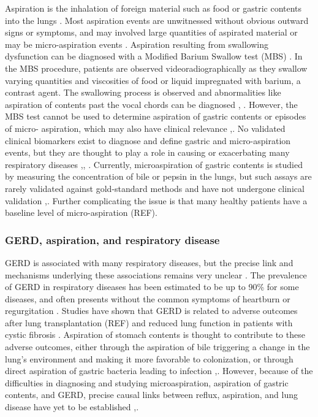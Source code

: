 \documentclass[12pt]{article}
\begin{document}
Aspiration is the inhalation of foreign material such as food or 
gastric contents into the lungs \cite{raghavendran-asp_injury-2011}. 
Most aspiration events are unwitnessed without obvious outward signs 
or symptoms, and may involved large quantities of aspirated material 
or may be micro-aspiration events \cite{raghavendran-asp_injury-2011}. 
Aspiration resulting from swallowing dysfunction can be diagnosed with 
a Modified Barium Swallow test (MBS) \cite{martinharris-mbs-2008}. In 
the MBS procedure, patients are observed videoradiographically as they 
swallow varying quantities and viscosities of food or liquid 
impregnated with barium, a contrast agent. The swallowing process is 
observed and abnormalities like aspiration of contents past the vocal 
chords can be diagnosed \cite{martinharris-clinical_mbs-2000},
\cite{martinharris-mbs-2008}. However, the MBS test cannot be used to 
determine aspiration of gastric contents or episodes of micro-
aspiration, which may also have clinical relevance 
\cite{raghavendran-asp_injury-2011},\cite{lee-pulm_asp-2014}. No validated clinical 
biomarkers exist to diagnose and define gastric and micro-aspiration 
events\cite{lee-pulm_asp-2014}, but they are thought to play a role in 
causing or exacerbating many respiratory diseases 
\cite{reen-aspirated_bile-2014},\cite{almomani-cf_sputum-2016},
\cite{houghton-microaspiration-2016}. Currently, microaspiration of gastric contents 
is studied by measuring the concentration of bile or pepsin in the 
lungs, but such assays are rarely validated against gold-standard 
methods and have not undergone clinical validation 
\cite{houghton-microaspiration-2016},\cite{lee-pulm_asp-2014}. Further complicating 
the issue is that many healthy patients have a baseline level of 
micro-aspiration (REF).

\subsubsection{GERD, aspiration, and respiratory disease}
GERD is associated with many respiratory diseases, but the precise 
link and mechanisms underlying these associations remains very unclear 
\cite{houghton-microaspiration-2016}. The prevalence of GERD in 
respiratory diseases has been estimated to be up to 90\% for some 
diseases, and often presents without the common symptoms of heartburn 
or regurgitation \cite{houghton-microaspiration-2016}. Studies have 
shown that GERD is related to adverse outcomes after lung 
transplantation (REF) and reduced lung function in patients with 
cystic fibrosis \cite{almomani-cf_sputum-2016}. Aspiration of stomach 
contents is thought to contribute to these adverse outcomes, either 
through the aspiration of bile triggering a change in the lung's 
environment and making it more favorable to colonization, or through 
direct aspiration of gastric bacteria leading to infection 
\cite{almomani-cf_sputum-2016},\cite{reen-aspirated_bile-2014}. 
However, because of the difficulties in diagnosing and studying 
microaspiration, aspiration of gastric contents, and GERD, precise 
causal links between reflux, aspiration, and lung disease have yet to 
be established \cite{almomani-cf_sputum-2016},\cite{houghton-microaspiration-2016}.
\end{document}

